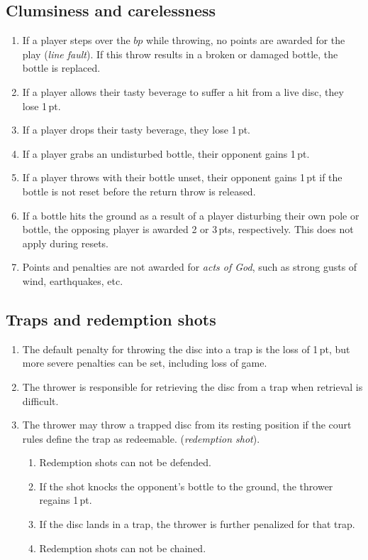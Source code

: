 \documentclass[11pt,letterpaper,twocolumn,english,DIV=calc]{scrartcl}
\begin{document}
\subsection{\label{subsec:clumsiness-and-carelessness}Clumsiness and carelessness}
\begin{enumerate}[leftmargin=2.8em, label=\thesubsection.\arabic*]
	\item If a player steps over the $bp$ while throwing, no points are awarded for the play (\emph{line fault}). 
	If this throw results in a broken or damaged bottle, the bottle is replaced.
	
	\item If a player allows their tasty beverage to suffer a hit from a live disc, they lose 1\,pt.
	\item If a player drops their tasty beverage, they lose 1\,pt.
	\item If a player grabs an undisturbed bottle, their opponent gains 1\,pt.
	\item If a player throws with their bottle unset, their opponent gains 1\,pt if the bottle is not reset before the return throw is released.
	\item If a bottle hits the ground as a result of a player disturbing their own pole or bottle, the opposing player is awarded 2 or 3\,pts, respectively.
	This does not apply during resets.
	\item Points and penalties are not awarded for \emph{acts of God}, such as strong gusts of wind, earthquakes, etc.
\end{enumerate}

\subsection{\label{subsec:traps}Traps and redemption shots}
\begin{enumerate}[leftmargin=2.8em, label=\thesubsection.\arabic*]
	\item The default penalty for throwing the disc into a trap is the loss of 1\,pt, but more severe penalties can be set, including loss of game.
	\item The thrower is responsible for retrieving the disc from a trap when retrieval is difficult.
	\item The thrower may throw a trapped disc from its resting position if the court rules define the trap as redeemable. (\emph{redemption shot}).

	\begin{enumerate}
		\item Redemption shots can not be defended.
		\item If the shot knocks the opponent's bottle to the ground, the thrower regains 1\,pt.
		\item If the disc lands in a trap, the thrower is further penalized for that trap.
		\item Redemption shots can not be chained.
	\end{enumerate}
\end{enumerate}
\end{document}
